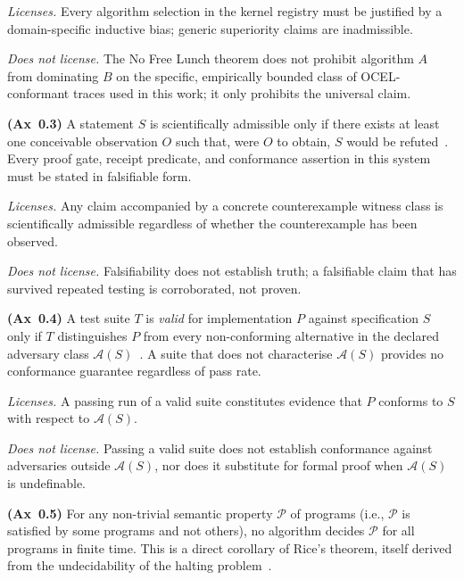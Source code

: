 \noindent\textit{Licenses.}
Every algorithm selection in the kernel registry must be justified by a
domain-specific inductive bias; generic superiority claims are inadmissible.

\noindent\textit{Does not license.}
The No Free Lunch theorem does not prohibit algorithm $A$ from dominating $B$
on the specific, empirically bounded class of OCEL-conformant traces used in
this work; it only prohibits the universal claim.

\begin{axiom}[Falsifiability]\label{ax:falsifiability}
\textbf{(Ax~0.3)}
A statement $S$ is scientifically admissible only if there exists at least one
conceivable observation $O$ such that, were $O$ to obtain, $S$ would be
refuted~\cite{popper1959,popper1963}.
Every proof gate, receipt predicate, and conformance assertion in this system
must be stated in falsifiable form.
\end{axiom}

\noindent\textit{Licenses.}
Any claim accompanied by a concrete counterexample witness class is
scientifically admissible regardless of whether the counterexample has been
observed.

\noindent\textit{Does not license.}
Falsifiability does not establish truth; a falsifiable claim that has survived
repeated testing is corroborated, not proven.

\begin{axiom}\label{ax:testselection}
\textbf{(Ax~0.4)}
A test suite $T$ is \emph{valid} for implementation $P$ against specification
$S$ only if $T$ distinguishes $P$ from every non-conforming alternative in the
declared adversary class $\mathcal{A}(S)$~\cite{goodenoughandgerhart1975}.
A suite that does not characterise $\mathcal{A}(S)$ provides no conformance
guarantee regardless of pass rate.
\end{axiom}

\noindent\textit{Licenses.}
A passing run of a valid suite constitutes evidence that $P$ conforms to $S$
with respect to $\mathcal{A}(S)$.

\noindent\textit{Does not license.}
Passing a valid suite does not establish conformance against adversaries outside
$\mathcal{A}(S)$, nor does it substitute for formal proof when $\mathcal{A}(S)$
is undefinable.

\begin{axiom}\label{ax:rice}
\textbf{(Ax~0.5)}
For any non-trivial semantic property $\mathcal{P}$ of programs (i.e.,
$\mathcal{P}$ is satisfied by some programs and not others), no algorithm
decides $\mathcal{P}$ for all programs in finite time.
This is a direct corollary of Rice's theorem, itself derived from the
undecidability of the halting problem~\cite{robinson1965}.
\end{axiom}

